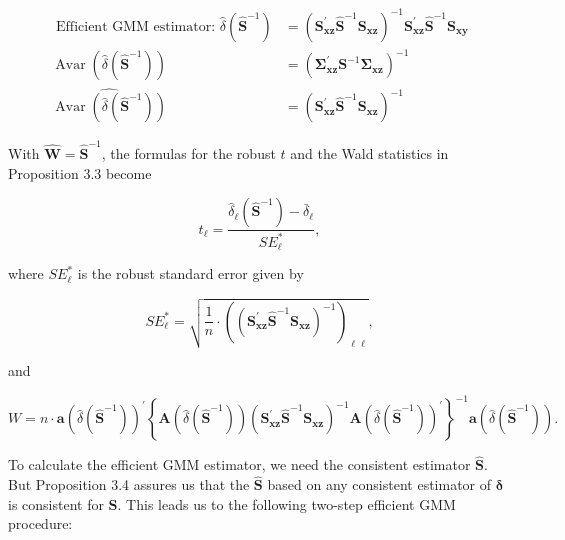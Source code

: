 \documentclass[10pt]{article}
\begin{document}
\begin{align*}
\text { Efficient GMM estimator: } \hat{\delta}\left(\widehat{\mathbf{S}}^{-1}\right) & =\left(\mathbf{S}_{\mathbf{x z}}^{\prime} \widehat{\mathbf{S}}^{-1} \mathbf{S}_{\mathbf{x z}}\right)^{-1} \mathbf{S}_{\mathbf{x z}}^{\prime} \widehat{\mathbf{S}}^{-1} \mathbf{S}_{\mathbf{x y}}  \tag{3.5.12}\\
\operatorname{Avar}\left(\hat{\delta}\left(\widehat{\mathbf{S}}^{-1}\right)\right) & =\left(\boldsymbol{\Sigma}_{\mathbf{x z}}^{\prime} \mathbf{S}^{-1} \mathbf{\Sigma}_{\mathbf{x z}}\right)^{-1}  \tag{3.5.13}\\
\widehat{\operatorname{Avar}\left(\hat{\delta}\left(\widehat{\mathbf{S}}^{-1}\right)\right)} & =\left(\mathbf{S}_{\mathbf{x z}}^{\prime} \widehat{\mathbf{S}}^{-1} \mathbf{S}_{\mathbf{x z}}\right)^{-1} \tag{3.5.14}
\end{align*}


With $\widehat{\mathbf{W}}=\widehat{\mathbf{S}}^{-1}$, the formulas for the robust $t$ and the Wald statistics in Proposition 3.3 become


\begin{equation*}
t_{\ell}=\frac{\hat{\delta}_{\ell}\left(\widehat{\mathbf{S}}^{-1}\right)-\bar{\delta}_{\ell}}{S E_{\ell}^{*}}, \tag{3.5.15}
\end{equation*}


where $S E_{\ell}^{*}$ is the robust standard error given by

$$
S E_{\ell}^{*}=\sqrt{\frac{1}{n} \cdot\left(\left(\mathbf{S}_{\mathbf{x z}}^{\prime} \widehat{\mathbf{S}}^{-1} \mathbf{S}_{\mathbf{x z}}\right)^{-1}\right)_{\ell \ell}},
$$

and


\begin{equation*}
W=n \cdot \mathbf{a}\left(\hat{\delta}\left(\widehat{\mathbf{S}}^{-1}\right)\right)^{\prime}\left\{\mathbf{A}\left(\hat{\delta}\left(\widehat{\mathbf{S}}^{-1}\right)\right)\left(\mathbf{S}_{\mathbf{x z}}^{\prime} \widehat{\mathbf{S}}^{-1} \mathbf{S}_{\mathbf{x z}}\right)^{-1} \mathbf{A}\left(\hat{\delta}\left(\widehat{\mathbf{S}}^{-1}\right)\right)^{\prime}\right\}^{-1} \mathbf{a}\left(\hat{\delta}\left(\widehat{\mathbf{S}}^{-1}\right)\right) . \tag{3.5.16}
\end{equation*}


To calculate the efficient GMM estimator, we need the consistent estimator $\widehat{\mathbf{S}}$. But Proposition 3.4 assures us that the $\widehat{\mathbf{S}}$ based on any consistent estimator of $\boldsymbol{\delta}$ is consistent for $\mathbf{S}$. This leads us to the following two-step efficient GMM procedure:
\end{document}
